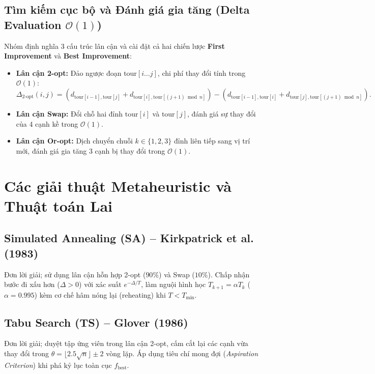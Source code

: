 \documentclass[12pt,a4paper]{report}
\begin{document}
\section{Tìm kiếm cục bộ và Đánh giá gia tăng (Delta Evaluation $\mathcal{O}(1)$)}
Nhóm định nghĩa 3 cấu trúc lân cận và cài đặt cả hai chiến lược \textbf{First Improvement} và \textbf{Best Improvement}:
\begin{itemize}
    \item \textbf{Lân cận 2-opt:} Đảo ngược đoạn $\text{tour}[i\dots j]$, chi phí thay đổi tính trong $\mathcal{O}(1)$:
    \[
        \Delta_{\text{2-opt}}(i,j) = (d_{\text{tour}[i-1], \text{tour}[j]} + d_{\text{tour}[i], \text{tour}[(j+1)\bmod n]}) - (d_{\text{tour}[i-1], \text{tour}[i]} + d_{\text{tour}[j], \text{tour}[(j+1)\bmod n]}).
    \]
    \item \textbf{Lân cận Swap:} Đổi chỗ hai đỉnh $\text{tour}[i]$ và $\text{tour}[j]$, đánh giá sự thay đổi của 4 cạnh kề trong $\mathcal{O}(1)$.
    \item \textbf{Lân cận Or-opt:} Dịch chuyển chuỗi $k \in \{1,2,3\}$ đỉnh liên tiếp sang vị trí mới, đánh giá gia tăng 3 cạnh bị thay đổi trong $\mathcal{O}(1)$.
\end{itemize}

\chapter{Các giải thuật Metaheuristic và Thuật toán Lai}

\section{Simulated Annealing (SA) -- Kirkpatrick et al. (1983)}
Đơn lời giải; sử dụng lân cận hỗn hợp 2-opt ($90\%$) và Swap ($10\%$). Chấp nhận bước đi xấu hơn ($\Delta > 0$) với xác suất $e^{-\Delta/T}$, làm nguội hình học $T_{k+1} = \alpha T_k$ ($\alpha = 0.995$) kèm cơ chế hâm nóng lại (reheating) khi $T < T_{\min}$.

\section{Tabu Search (TS) -- Glover (1986)}
Đơn lời giải; duyệt tập ứng viên trong lân cận 2-opt, cấm cắt lại các cạnh vừa thay đổi trong $\theta = \lfloor 2.5\sqrt{n}\rfloor \pm 2$ vòng lặp. Áp dụng tiêu chí mong đợi (\textit{Aspiration Criterion}) khi phá kỷ lục toàn cục $f_{\text{best}}$.
\end{document}
